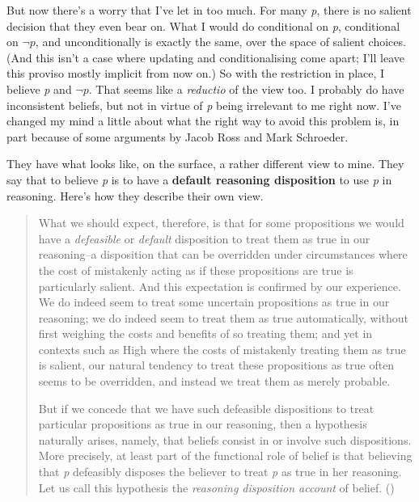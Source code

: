 \documentclass[
  11pt,
  letterpaper,
  DIV=11,
  numbers=noendperiod,
  twoside]{scrartcl}
\begin{document}
But now there's a worry that I've let in too much. For many \emph{p},
there is no salient decision that they even bear on. What I would do
conditional on \emph{p}, conditional on \(\neg p\), and unconditionally
is exactly the same, over the space of salient choices. (And this isn't
a case where updating and conditionalising come apart; I'll leave this
proviso mostly implicit from now on.) So with the restriction in place,
I believe \emph{p} and \(\neg p\). That seems like a \emph{reductio} of
the view too. I probably do have inconsistent beliefs, but not in virtue
of \emph{p} being irrelevant to me right now. I've changed my mind a
little about what the right way to avoid this problem is, in part
because of some arguments by Jacob Ross and Mark Schroeder.

They have what looks like, on the surface, a rather different view to
mine. They say that to believe \emph{p} is to have a \textbf{default
reasoning disposition} to use \emph{p} in reasoning. Here's how they
describe their own view.

\begin{quote}
What we should expect, therefore, is that for some propositions we would
have a \emph{defeasible} or \emph{default} disposition to treat them as
true in our reasoning--a disposition that can be overridden under
circumstances where the cost of mistakenly acting as if these
propositions are true is particularly salient. And this expectation is
confirmed by our experience. We do indeed seem to treat some uncertain
propositions as true in our reasoning; we do indeed seem to treat them
as true automatically, without first weighing the costs and benefits of
so treating them; and yet in contexts such as High where the costs of
mistakenly treating them as true is salient, our natural tendency to
treat these propositions as true often seems to be overridden, and
instead we treat them as merely probable.

But if we concede that we have such defeasible dispositions to treat
particular propositions as true in our reasoning, then a hypothesis
naturally arises, namely, that beliefs consist in or involve such
dispositions. More precisely, at least part of the functional role of
belief is that believing that \emph{p} defeasibly disposes the believer
to treat \emph{p} as true in her reasoning. Let us call this hypothesis
the \emph{reasoning disposition account} of belief.
()
\end{quote}
\end{document}
